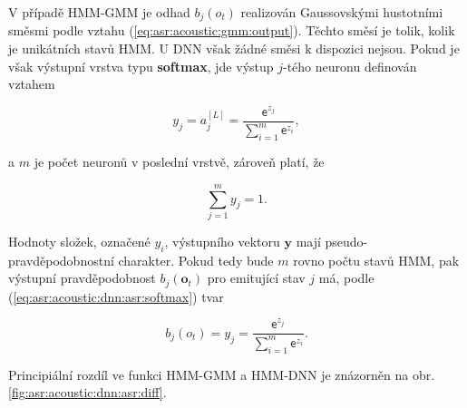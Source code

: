 V případě HMM-GMM je odhad $b_j\left(o_t\right)$ realizován Gaussovskými hustotními směsmi podle vztahu (\ref{eq:asr:acoustic:gmm:output}). Těchto směsí je tolik, kolik je unikátních stavů HMM. U DNN však žádné směsi k dispozici nejsou. Pokud je však výstupní vrstva typu \textbf{softmax}, jde výstup $j$-tého neuronu definován vztahem

\begin{equation}
  y_{j} = a_{j}^{[L]} = \frac{\mathsf{e}^{z_j}}{\sum_{i=1}^{m}\mathsf{e}^{z_i}},
  \label{eq:asr:acoustic:dnn:asr:softmax}
\end{equation}

\noindent a $m$ je počet neuronů v poslední vrstvě, zároveň platí, že

\begin{equation}
  \sum_{j=1}^{m} y_{j} = 1.
  \label{eq:asr:acoustic:dnn:asr:softmax:criterium}
\end{equation}

\noindent Hodnoty složek, označené $y_{i}$, výstupního vektoru $\boldsymbol{y}$ mají pseudo-pravděpodobnostní charakter. Pokud tedy bude $m$ rovno počtu stavů HMM, pak výstupní pravděpodobnost $b_{j} \left(\boldsymbol{o}_t\right)$ pro emitující stav $j$ má, podle (\ref{eq:asr:acoustic:dnn:asr:softmax}) tvar

\begin{equation}
  b_{j} \left(o_t\right) = y_{j} = \frac{\mathsf{e}^{z_j}}{\sum_{i=1}^{m}\mathsf{e}^{z_i}}.
  \label{eq:asr:acoustic:dnn:asr:softmax:criterium}
\end{equation}

\noindent Principiální rozdíl ve funkci HMM-GMM a HMM-DNN je znázorněn na obr. \ref{fig:asr:acoustic:dnn:asr:diff}.

